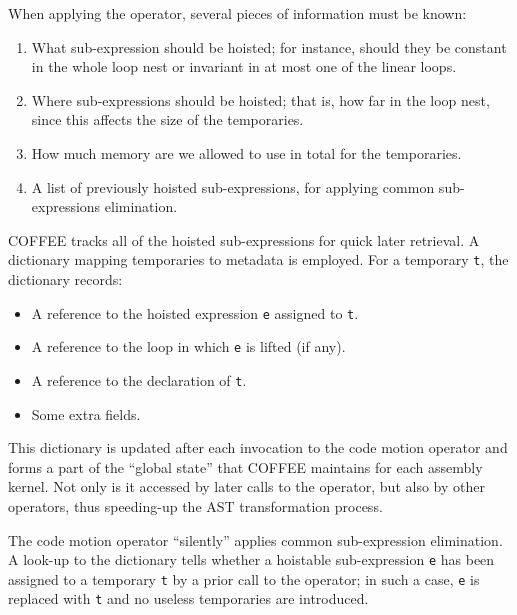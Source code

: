 When applying the operator, several pieces of information must be known:
\begin{enumerate}
\item What sub-expression should be hoisted; for instance, should they be constant in the whole loop nest or invariant in at most one of the linear loops.
\item Where sub-expressions should be hoisted; that is, how far in the loop nest, since this affects the size of the temporaries.
\item How much memory are we allowed to use in total for the temporaries.
\item A list of previously hoisted sub-expressions, for applying common sub-expressions elimination.
\end{enumerate}

COFFEE tracks all of the hoisted sub-expressions for quick later retrieval. A dictionary mapping temporaries to metadata is employed. For a temporary \texttt{t}, the dictionary records:
\begin{itemize}
\item A reference to the hoisted expression \texttt{e} assigned to \texttt{t}.
\item A reference to the loop in which \texttt{e} is lifted (if any).
\item A reference to the declaration of \texttt{t}.
\item Some extra fields.
\end{itemize}
This dictionary is updated after each invocation to the code motion operator and forms a part of the ``global state'' that COFFEE maintains for each assembly kernel. Not only is it accessed by later calls to the operator, but also by other operators, thus speeding-up the AST transformation process.

The code motion operator ``silently'' applies common sub-expression elimination. A look-up to the dictionary tells whether a hoistable sub-expression \texttt{e} has been assigned to a temporary \texttt{t} by a prior call to the operator; in such a case, \texttt{e} is replaced with \texttt{t} and no useless temporaries are introduced. 

%


